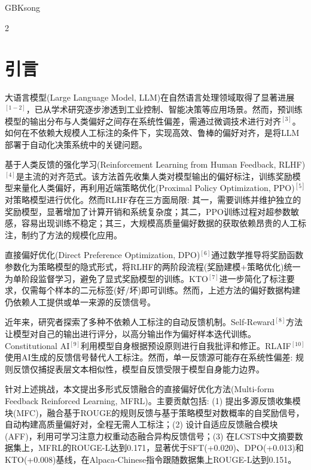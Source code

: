 \begin{CJK*}{GBK}{song}
\renewcommand\refname{\normalsize{{\CJKfamily{hei}参考文献}}}

\setlength{\oddsidemargin}{-.5cm}
 \setlength{\textwidth}{171mm}
\vspace{10pt}
\begin{multicols}{2}
\fontsize{10.5bp}{12.9bp}\selectfont

\section{引言}

大语言模型(Large Language Model, LLM)在自然语言处理领域取得了显著进展$^{[1-2]}$，已从学术研究逐步渗透到工业控制、智能决策等应用场景。然而，预训练模型的输出分布与人类偏好之间存在系统性偏差，需通过微调技术进行对齐$^{[3]}$。如何在不依赖大规模人工标注的条件下，实现高效、鲁棒的偏好对齐，是将LLM部署于自动化决策系统中的关键问题。

基于人类反馈的强化学习(Reinforcement Learning from Human Feedback, RLHF)$^{[4]}$是主流的对齐范式。该方法首先收集人类对模型输出的偏好标注，训练奖励模型来量化人类偏好，再利用近端策略优化(Proximal Policy Optimization, PPO)$^{[5]}$对策略模型进行优化。然而RLHF存在三方面局限: 其一，需要训练并维护独立的奖励模型，显著增加了计算开销和系统复杂度；其二，PPO训练过程对超参数敏感，容易出现训练不稳定；其三，大规模高质量偏好数据的获取依赖昂贵的人工标注，制约了方法的规模化应用。

直接偏好优化(Direct Preference Optimization, DPO)$^{[6]}$通过数学推导将奖励函数参数化为策略模型的隐式形式，将RLHF的两阶段流程(奖励建模+策略优化)统一为单阶段监督学习，避免了显式奖励模型的训练。KTO$^{[7]}$进一步简化了标注要求，仅需每个样本的二元标签(好/坏)即可训练。然而，上述方法的偏好数据构建仍依赖人工提供或单一来源的反馈信号。

近年来，研究者探索了多种不依赖人工标注的自动反馈机制。Self-Reward$^{[8]}$方法让模型对自己的输出进行评分，以高分输出作为偏好样本迭代训练。Constitutional AI$^{[9]}$利用模型自身根据预设原则进行自我批评和修正。RLAIF$^{[10]}$使用AI生成的反馈信号替代人工标注。然而，单一反馈源可能存在系统性偏差: 规则反馈仅捕捉表层文本相似性，模型自反馈受限于模型自身能力边界。

针对上述挑战，本文提出多形式反馈融合的直接偏好优化方法(Multi-form Feedback Reinforced Learning, MFRL)。主要贡献包括: (1) 提出多源反馈收集模块(MFC)，融合基于ROUGE的规则反馈与基于策略模型对数概率的自奖励信号，自动构建高质量偏好对，全程无需人工标注；(2) 设计自适应反馈融合模块(AFF)，利用可学习注意力权重动态融合异构反馈信号；(3) 在LCSTS中文摘要数据集上，MFRL的ROUGE-L达到0.171，显著优于SFT(+0.020)、DPO(+0.013)和KTO(+0.008)基线，在Alpaca-Chinese指令跟随数据集上ROUGE-L达到0.151。


\end{multicols}
\end{CJK*}
